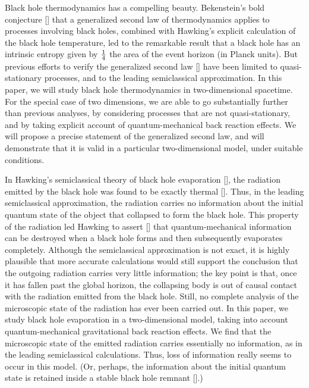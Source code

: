 Black hole thermodynamics has a compelling beauty.  Bekenstein's bold
conjecture [\cite{bek}]  that a generalized second law of thermodynamics
applies to processes involving black holes, combined with Hawking's explicit
calculation of the black hole temperature, led to the remarkable result that a
black hole has an intrinsic entropy given by ${1\over 4}$ the area of the event
horizon (in Planck units).  But previous efforts to verify the generalized
second law [\cite{zurekthorne,frolov}] have been limited to quasi-stationary
processes, and to the leading semiclassical approximation.  In this paper, we
will study black hole thermodynamics in two-dimensional spacetime.  For the
special case of two dimensions, we are able to go substantially
further than previous
analyses, by considering processes that are not quasi-stationary, and by taking
explicit account of quantum-mechanical back reaction effects. We will propose a
precise statement of the generalized second law, and will demonstrate that it
is valid in a particular two-dimensional model, under suitable conditions.

In Hawking's semiclassical theory of black hole evaporation [\cite{hawk}], the
radiation emitted by the black hole was found to be exactly thermal
[\cite{wald}].  Thus, in the leading semiclassical approximation, the radiation
carries no information about the initial quantum state of the object that
collapsed to form the black hole.  This property of the radiation led Hawking
to assert [\cite{hawk2}] that quantum-mechanical information can be destroyed
when a black hole forms and then subsequently evaporates completely.  Although
the semiclassical approximation is not exact, it is highly plausible that more
accurate calculations would still support the conclusion that the outgoing
radiation carries very little information; the key point is that, once it has
fallen past the global horizon, the collapsing body is out of causal contact
with the radiation emitted from the black hole.  Still, no complete analysis of
the microscopic state of the radiation has ever been carried out.  In this
paper, we study black hole evaporation in a two-dimensional model, taking into
account quantum-mechanical gravitational back reaction effects.  We find that
the microscopic state of the emitted radiation carries essentially no
information, as in the leading semiclassical calculations.  Thus, loss of
information really seems to occur in this model.  (Or, perhaps, the information
about the initial quantum state is retained inside a stable black hole remnant
[\cite{remnant}].)

